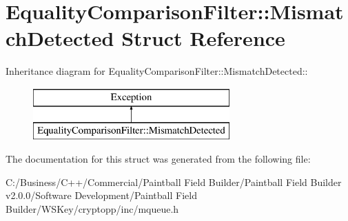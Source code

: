 \hypertarget{struct_equality_comparison_filter_1_1_mismatch_detected}{
\section{EqualityComparisonFilter::MismatchDetected Struct Reference}
\label{struct_equality_comparison_filter_1_1_mismatch_detected}
}
Inheritance diagram for EqualityComparisonFilter::MismatchDetected::\begin{figure}[H]
\begin{center}
\leavevmode
\includegraphics[height=2cm]{struct_equality_comparison_filter_1_1_mismatch_detected}
\end{center}
\end{figure}


The documentation for this struct was generated from the following file:\begin{DoxyCompactItemize}
\item 
C:/Business/C++/Commercial/Paintball Field Builder/Paintball Field Builder v2.0.0/Software Development/Paintball Field Builder/WSKey/cryptopp/inc/mqueue.h\end{DoxyCompactItemize}

